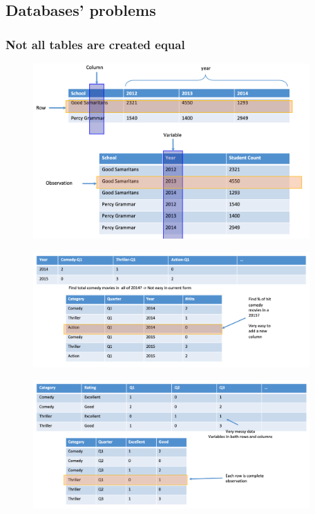 \documentclass[10pt,a4paper]{article}
\begin{document}
\subsection{Databases' problems}
\subsubsection{Not all tables are created equal}
	\begin{figure}[ht!]
 \hfill \includegraphics[width=300pt]{images/equal-tables1}
 \hspace*{\fill}
 \end{figure} 
 	\begin{figure}[ht!]
 \hfill \includegraphics[width=300pt]{images/equal-tables2}
 \hspace*{\fill}
 \end{figure} 
 	\begin{figure}[ht!]
 \hfill \includegraphics[width=300pt]{images/equal-tables3}
 \hspace*{\fill}
 \end{figure} 
 \pagebreak
\end{document}
